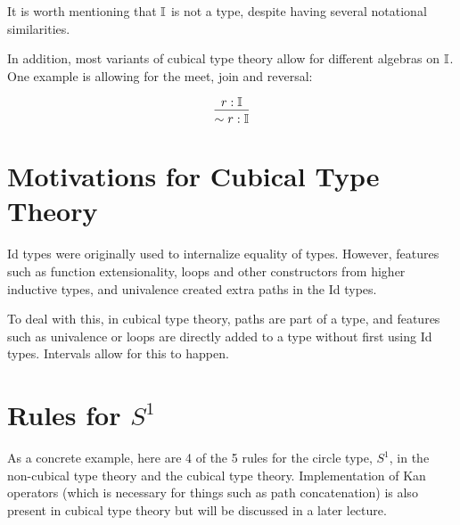 \documentclass[11pt]{article}
\begin{document}
\begin{prooftree*}
\end{prooftree*}

\begin{prooftree*}
\end{prooftree*}

It is worth mentioning that $\mathbb{I}$ is not a type, despite having several notational similarities.

In addition, most variants of cubical type theory allow for different algebras on $\mathbb{I}$. One example is allowing for the meet, join and reversal:

\begin{prooftree*}
\end{prooftree*}

\begin{prooftree*}
\end{prooftree*}

\[
\begin{prooftree}
    \hypo{\oftype{r}{\bI}}
    \infer1{\oftype{\sim r}{\bI}}
\end{prooftree}
\]

\section{Motivations for Cubical Type Theory}
Id types were originally used to internalize equality of types. However, features such as function extensionality, loops and other constructors from higher inductive types, and univalence created extra paths in the Id types.

To deal with this, in cubical type theory, paths are part of a type, and features such as univalence or loops are directly added to a type without first using Id types. Intervals allow for this to happen.

\section{Rules for $S^1$}

As a concrete example, here are 4 of the 5 rules for the circle type, $S^1$, in the
non-cubical type theory and the cubical type theory. Implementation of Kan
operators (which is necessary for things such as path concatenation) is also
present in cubical type theory but will be discussed in a later lecture.
\end{document}
